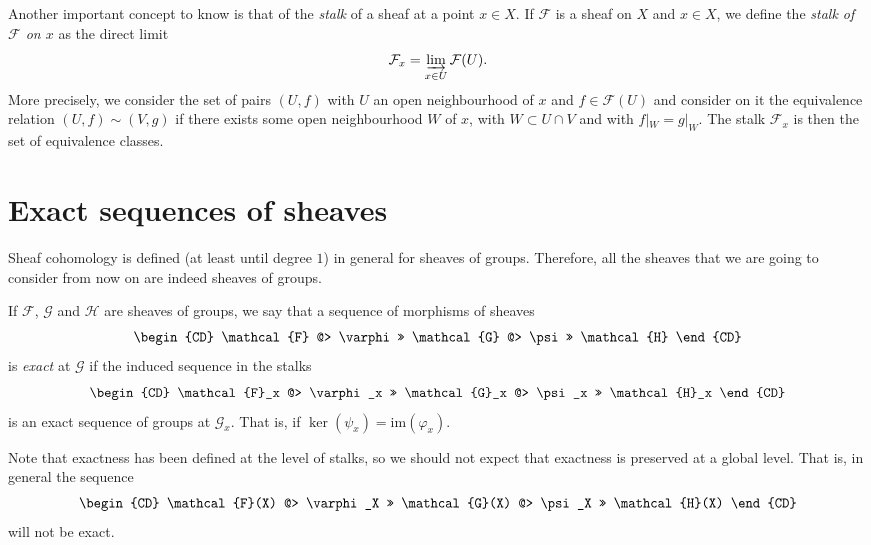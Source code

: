     Another important concept to know is that of the \emph{stalk} of a sheaf at a point $x\in X$. If $\mathcal{F}$ is a sheaf on $X$ and $x\in X$, we define the \emph{stalk of $\mathcal{F}$ on $x$} as the direct limit
    \begin{equation*}
      \mathcal{F}_x=\varinjlim_{x \in U} \mathcal{F}(U).
    \end{equation*}
    More precisely, we consider the set of pairs $(U,f)$ with $U$ an open neighbourhood of $x$ and $f\in \mathcal{F}(U)$ and consider on it the equivalence relation $(U,f)\sim (V,g)$ if there exists some open neighbourhood $W$ of $x$, with $W\subset U\cap V$ and with $f|_W =g|_W$. The stalk $\mathcal{F}_x$ is then the set of equivalence classes.

    \section*{Exact sequences of sheaves}
    Sheaf cohomology is defined (at least until degree $1$) in general for sheaves of groups. Therefore, all the sheaves that we are going to consider from now on are indeed sheaves of groups. 

    If $\mathcal{F}$, $\mathcal{G}$ and $\mathcal{H}$ are sheaves of groups, we say that a sequence of morphisms of sheaves 
    \begin{equation*}
      \begin{CD}
	\mathcal{F} @> \varphi >> \mathcal{G} @> \psi >> \mathcal{H}
      \end{CD}
    \end{equation*}
    is \emph{exact} at $\mathcal{G}$ if the induced sequence in the stalks
    \begin{equation*}
      \begin{CD}
	\mathcal{F}_x @> \varphi_x >> \mathcal{G}_x @> \psi_x >> \mathcal{H}_x
      \end{CD}
    \end{equation*}
    is an exact sequence of groups at $\mathcal{G}_x$. That is, if $\ker(\psi_x) = \mathrm{im}(\varphi_x)$.

    Note that exactness has been defined at the level of stalks, so we should not expect that exactness is preserved at a global level. That is, in general the sequence 
    \begin{equation*}
      \begin{CD}
	\mathcal{F}(X) @> \varphi_X >> \mathcal{G}(X) @> \psi_X >> \mathcal{H}(X)
      \end{CD}
    \end{equation*}
    will not be exact.

